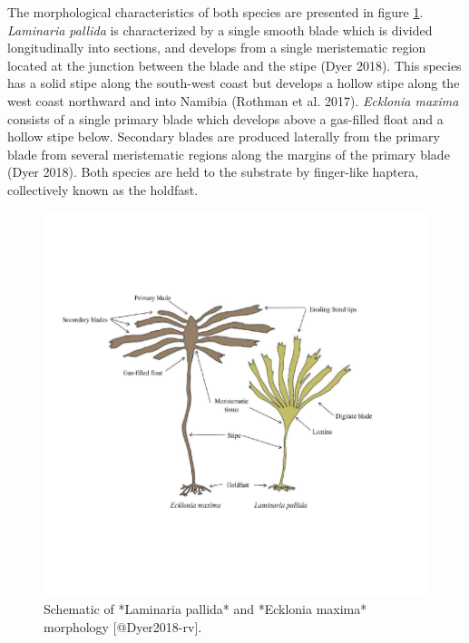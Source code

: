 \documentclass[
  a4paper,
]{article}
\begin{document}
The morphological characteristics of both species are presented in
figure \ref{fig:schematic}. \emph{Laminaria pallida} is characterized by
a single smooth blade which is divided longitudinally into sections, and
develops from a single meristematic region located at the junction
between the blade and the stipe (Dyer 2018). This species has a solid
stipe along the south-west coast but develops a hollow stipe along the
west coast northward and into Namibia (Rothman et al. 2017).
\emph{Ecklonia maxima} consists of a single primary blade which develops
above a gas-filled float and a hollow stipe below. Secondary blades are
produced laterally from the primary blade from several meristematic
regions along the margins of the primary blade (Dyer 2018). Both species
are held to the substrate by finger-like haptera, collectively known as
the holdfast.

\begin{figure}

{\centering \includegraphics{thesis_chapter_2_files/figure-latex/schematic-1} 

}

\caption{\label{fig:schematic}Schematic of *Laminaria pallida* and *Ecklonia maxima* morphology [@Dyer2018-rv].}\label{fig:schematic}
\end{figure}
\end{document}
